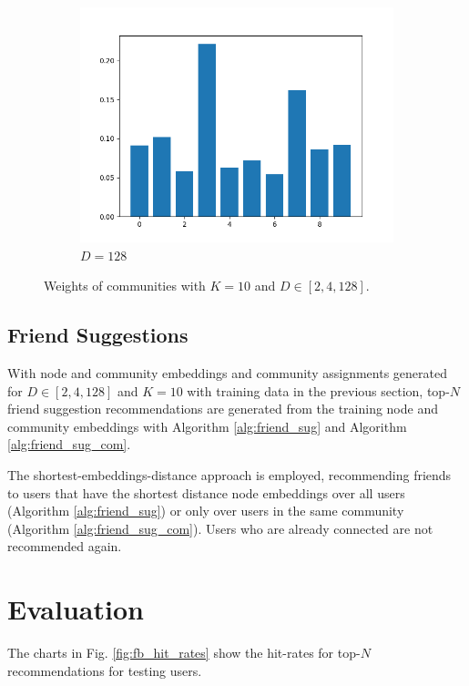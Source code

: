 \documentclass[conference]{IEEEtran}
\begin{document}
\begin{figure}[htbp]
\begin{subfigure}{.33\textwidth}
        \centering
        \includegraphics[width=1\linewidth]{images/fb/weights_d128.png}
        \caption{$D=128$}
        \label{fig:fb_emb_weights_d128}
    \end{subfigure}%
    \caption{Weights of communities with $K=10$ and $D \in [2,4,128]$.}
    \label{fig:fb_emb_weights}
\end{figure}

\subsection{Friend Suggestions}

With node and community embeddings and community assignments generated for $D \in [2,4,128]$ and $K=10$ with training data in the previous section, top-$N$ friend suggestion recommendations are generated from the training node and community embeddings with Algorithm \ref{alg:friend_sug} and Algorithm \ref{alg:friend_sug_com}.

The shortest-embeddings-distance approach is employed, recommending friends to users that have the shortest distance node embeddings over all users (Algorithm \ref{alg:friend_sug}) or only over users in the same community (Algorithm \ref{alg:friend_sug_com}). Users who are already connected are not recommended again.

\section{Evaluation}

The charts in Fig. \ref{fig:fb_hit_rates} show the hit-rates for top-$N$ recommendations for testing users.
\end{document}
